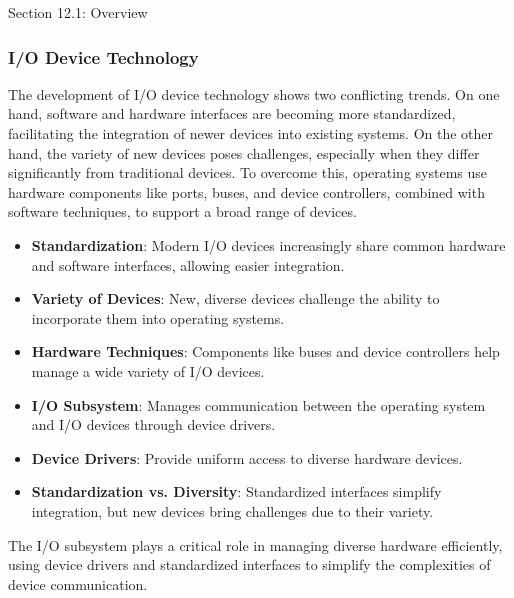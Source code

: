 \begin{notes}{Section 12.1: Overview}
    \subsubsection*{I/O Device Technology}
    
    The development of I/O device technology shows two conflicting trends. On one hand, software and hardware interfaces are becoming more standardized, facilitating the integration of newer devices 
    into existing systems. On the other hand, the variety of new devices poses challenges, especially when they differ significantly from traditional devices. To overcome this, operating systems use 
    hardware components like ports, buses, and device controllers, combined with software techniques, to support a broad range of devices.
    
    \begin{highlight}
    
        \begin{itemize}
            \item \textbf{Standardization}: Modern I/O devices increasingly share common hardware and software interfaces, allowing easier integration.
            \item \textbf{Variety of Devices}: New, diverse devices challenge the ability to incorporate them into operating systems.
            \item \textbf{Hardware Techniques}: Components like buses and device controllers help manage a wide variety of I/O devices.
        \end{itemize}
    
    \end{highlight}
    
    \begin{highlight}
    
        \begin{itemize}
            \item \textbf{I/O Subsystem}: Manages communication between the operating system and I/O devices through device drivers.
            \item \textbf{Device Drivers}: Provide uniform access to diverse hardware devices.
            \item \textbf{Standardization vs. Diversity}: Standardized interfaces simplify integration, but new devices bring challenges due to their variety.
        \end{itemize}
    
    The I/O subsystem plays a critical role in managing diverse hardware efficiently, using device drivers and standardized interfaces to simplify the complexities of device communication.
    
    \end{highlight}
\end{notes}

